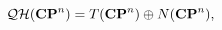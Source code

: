 \begin{equation}
{\cal QH}({\bf CP}^n)=T({\bf CP}^n) \oplus N({\bf CP}^n),
\label{adxj}
\end{equation}

